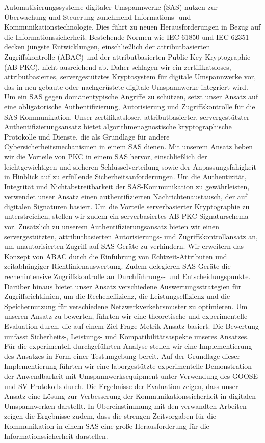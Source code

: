\Abstract
Automatisierungssysteme digitaler Umspannwerke (SAS) nutzen zur Überwachung und Steuerung zunehmend Informations- und Kommunikationstechnologie.
Dies führt zu neuen Herausforderungen in Bezug auf die Informationssicherheit.
Bestehende Normen wie IEC 61850 und IEC 62351 decken jüngste Entwicklungen, einschließlich der attributbasierten Zugriffskontrolle (ABAC) und der attributbasierten Public-Key-Kryptographie (AB-PKC), nicht ausreichend ab.
Daher schlagen wir ein zertifikatsloses, attributbasiertes, servergestütztes Kryptosystem für digitale Umspannwerke vor, das in neu gebaute oder nachgerüstete digitale Umspannwerke integriert wird.
Um ein SAS gegen domänentypische Angriffe zu schützen, setzt unser Ansatz auf eine obligatorische Authentifizierung, Autorisierung und Zugriffskontrolle für die SAS-Kommunikation.
Unser zertifikatsloser, attributbasierter, servergestützter Authentifizierungsansatz bietet algorithmenagnostische kryptographische Protokolle und Dienste, die als Grundlage für andere Cybersicherheitsmechanismen in einem SAS dienen.
Mit unserem Ansatz heben wir die Vorteile von PKC in einem SAS hervor, einschließlich der leichtgewichtigen und sicheren Schlüsselverteilung sowie der Anpassungsfähigkeit in Hinblick auf zu erfüllende Sicherheitsanforderungen.
Um die Authentizität, Integrität und Nicht\-abstreitbarkeit der SAS-Kommunikation zu gewährleisten, verwendet unser Ansatz einen authentifizierten Nachrichtenaustausch, der auf digitalen Signaturen basiert.
Um die Vorteile serverbasierter Kryptographie zu unterstreichen, stellen wir zudem ein serverbasiertes AB-PKC-Signaturschema vor.
Zusätzlich zu unserem Authentifizierungsansatz bieten wir einen servergestützten, attributbasierten Autorisierungs- und Zugriffskontrollansatz an, um unautorisierten Zugriff auf SAS-Geräte zu verhindern.
Wir erweitern das Konzept von ABAC durch die Einführung von Echtzeit-Attributen und zeitabhängiger Richtlinienauswertung.
Zudem delegieren SAS-Geräte die rechenintensive Zugriffskontrolle an Durchführungs- und Entscheidungspunkte.
Darüber hinaus bietet unser Ansatz verschiedene Auswertungsstrategien für Zugriffsrichtlinien, um die Recheneffizienz, die Leistungseffizienz und die Speichernutzung für verschiedene Netzwerkverkehrsmuster zu optimieren.
Um unseren Ansatz zu bewerten, führten wir eine theoretische und experimentelle Evaluation durch, die auf einem Ziel-Frage-Metrik-Ansatz basiert.
Die Bewertung umfasst Sicherheits-, Leistungs- und Kompatibilitätsaspekte unseres Ansatzes.
Für die experimentell durchgeführten Analyse stellen wir eine Implementierung des Ansatzes in Form einer Testumgebung bereit.
Auf der Grundlage dieser Implementierung führten wir eine laborgestützte experimentelle Demonstration der Anwendbarkeit mit Umspannwerksequipment unter Verwendung des GOOSE- und SV-Protokolls durch.
Die Ergebnisse der Evaluation zeigen, dass unser Ansatz eine Lösung zur Verbesserung der Kommunikationssicherheit in digitalen Umspannwerken darstellt.
In Übereinstimmung mit den verwandten Arbeiten zeigen die Ergebnisse zudem, dass die strengen Zeitvorgaben für die Kommunikation in einem SAS eine große Herausforderung für die Informationssicherheit darstellen.
